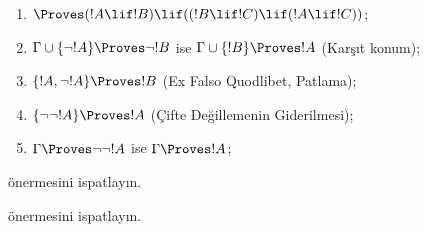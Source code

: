 \documentclass[../../../include/open-logic-section]{subfiles}
\begin{document}
\begin{prop}
\begin{enumerate}
\item $\Proves (!A \lif !B) \lif ((!B \lif !C)
  \lif (!A \lif !C))$; 
\item $\Gamma \cup \{ \lnot !A\} \Proves \lnot !B$ ise
  $\Gamma \cup \{ !B\} \Proves !A$ (Karşıt konum); 
\item $\{ !A, \lnot!A\} \Proves !B$ (Ex Falso Quodlibet, Patlama);
\item $\{ \lnot\lnot!A\} \Proves !A$ (Çifte Değillemenin Giderilmesi);
\item $\Gamma \Proves \lnot\lnot!A$ ise $\Gamma \Proves !A$;
\end{enumerate}
\end{prop}

\begin{prob}
   önermesini ispatlayın.
\end{prob}
\tagendprob

\begin{prob}
   önermesini ispatlayın.
\end{prob}
\tagendprob
\end{document}
